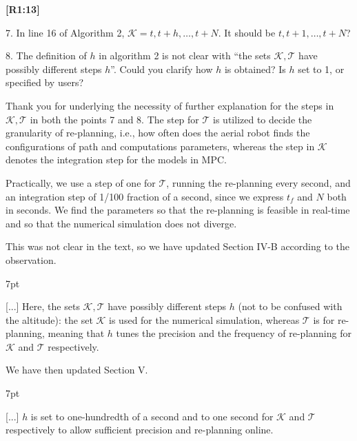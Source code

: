 \documentclass[10pt]{letter}
\newenvironment{formal}{%
  \def\FrameCommand{%
    \hspace{1pt}%
    {\color{red}\vrule width 2pt}%
    {\color{formalshade}\vrule width 4pt}%
    \colorbox{formalshade}%
  }%
  \MakeFramed{\advance\hsize-\width\FrameRestore}%
  \noindent\hspace{-4.55pt}%
  \begin{adjustwidth}{}{7pt}%
  \vspace{2pt}\vspace{2pt}%
}
{%
  \vspace{2pt}\end{adjustwidth}\endMakeFramed%
}
\begin{document}
{\hspace*{-4.5em}\textbf{[R1:13]}\vspace*{-1.9em}}

7. In line 16 of Algorithm 2, $\mathcal{K}={t,t+h,\dots,t+N}$. It should be ${t,t+1,\dots,t+N}$?

8. The definition of $h$ in algorithm 2 is not clear with ``the sets $\mathcal{K},\mathcal{T}$ have possibly different steps $h$''. Could you clarify how $h$ is obtained? Is $h$ set to 1, or specified by users?

{\color{blue} 

{\hspace*{-4.5em}{[R1:13]}\vspace*{-1.9em}}

Thank you for underlying the necessity of further explanation for the steps in $\mathcal{K},\mathcal{T}$ in both the points 7 and 8. The step for $\mathcal{T}$ is utilized to decide the granularity of re-planning, i.e., how often does the aerial robot finds the configurations of path and computations parameters, whereas the step in $\mathcal{K}$ denotes the integration step for the models in MPC.

Practically, we use a step of one for $\mathcal{T}$, running the re-planning every second, and an integration step of 1/100 fraction of a second, since we express $t_f$ and $N$ both in seconds. We find the parameters so that the re-planning is feasible in real-time and so that the numerical simulation does not diverge.

This was not clear in the text, so we have updated Section IV-B according to the observation.

\begin{formal}
  \color{black} [...] Here, the sets $\mathcal{K},\mathcal{T}$ have possibly different steps $h$ (not to be confused with the altitude){\color{blue}: 
  the set $\mathcal{K}$ is used for the numerical simulation, whereas $\mathcal{T}$ is for re-planning, meaning that $h$ tunes the precision and the frequency of re-planning for $\mathcal{K}$ and $\mathcal{T}$ respectively.}
  \vspace*{1ex}
\end{formal}

We have then updated Section V.


\begin{formal}
  \color{black} [...] {\color{blue} $h$ is set to one-hundredth of a second and to one second for $\mathcal{K}$ and $\mathcal{T}$ respectively to allow sufficient precision and re-planning online.}
  \vspace*{1ex}
\end{formal}


}
\end{document}
